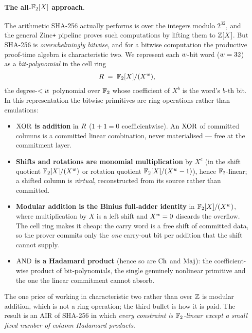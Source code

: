 \paragraph{The all-$\mathbb{F}_2[X]$ approach.} The arithmetic SHA-256 actually
performs is over the integers modulo $2^{32}$, and the general Zinc\texttt{+}
pipeline \cite{zincplus} proves such computations by lifting them to $\mathbb{Z}[X]$.
But SHA-256 is \emph{overwhelmingly bitwise}, and for a bitwise computation the
productive proof-time algebra is characteristic two. We represent each
$w$-bit word ($w = 32$) as a \emph{bit-polynomial} in the cell ring
\[
  R \;=\; \mathbb{F}_2[X]/(X^{w}),
\]
the degree-$<w$ polynomial over $\mathbb{F}_2$ whose coefficient of $X^b$ is the
word's $b$-th bit. In this representation the bitwise primitives are ring
operations rather than emulations:
\begin{itemize}[leftmargin=2em]
  \item \textbf{$\operatorname{XOR}$ is addition} in $R$ ($1+1 = 0$ coefficientwise).
    An $\operatorname{XOR}$ of committed columns is a committed linear combination, never
    materialised --- free at the commitment layer.
  \item \textbf{Shifts and rotations are monomial multiplication} by $X^c$
    (in the shift quotient $\mathbb{F}_2[X]/(X^{w})$ or rotation quotient $\mathbb{F}_2[X]/(X^{w}-1)$), hence
    $\mathbb{F}_2$-linear; a shifted column is \emph{virtual}, reconstructed from its
    source rather than committed.
  \item \textbf{Modular addition is the Binius full-adder identity} in
    $\mathbb{F}_2[X]/(X^{w})$, where multiplication by $X$ is a left shift and $X^{w}=0$
    discards the overflow. The cell ring makes it cheap: the carry word is a
    free shift of committed data, so the prover commits only the \emph{one}
    carry-out bit per addition that the shift cannot supply.
  \item \textbf{$\operatorname{AND}$ is a Hadamard product} (hence so are $\operatorname{Ch}$ and $\operatorname{Maj}$):
    the coefficient-wise product of bit-polynomials, the single genuinely
    nonlinear primitive and the one the linear commitment cannot absorb.
\end{itemize}
The one price of working in characteristic two rather than over $\mathbb{Z}$ is modular
addition, which is not a ring operation; the third bullet is how it is paid.
The result is an AIR of SHA-256 in which \emph{every constraint is
$\mathbb{F}_2$-linear except a small fixed number of column Hadamard products}.


